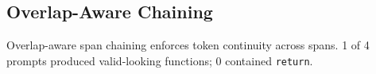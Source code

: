 \subsection{Overlap-Aware Chaining}
Overlap-aware span chaining enforces token continuity across spans.
1 of 4 prompts produced valid-looking functions; 0 contained \texttt{return}.
